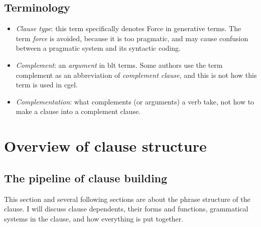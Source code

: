 \documentclass{article}
\newcommand*{\term}[1]{\emph{#1}}
\begin{document}
\subsection{Terminology}

\begin{itemize}
    \item \term{Clause type}: this term specifically denotes Force in generative terms.
    The term \term{force} is avoided, 
    because it is too pragmatic,
    and may cause confusion between a pragmatic system and its syntactic coding.
    \item \term{Complement}: an \term{argument} in \ac{blt} terms. 
    Some authors use the term complement as an abbreviation of \term{complement clause},
    and this is not how this term is used in \ac{cgel}.
    \item \term{Complementation}: what complements (or arguments) a verb take, 
    not how to make a clause into a complement clause.
\end{itemize}

\section{Overview of clause structure}

\subsection{The pipeline of clause building}\label{sec:pipeline}

This section and several following sections are about the phrase structure of the clause.
I will discuss clause dependents, 
their forms and functions,
grammatical systems in the clause,
and how everything is put together.
\end{document}
